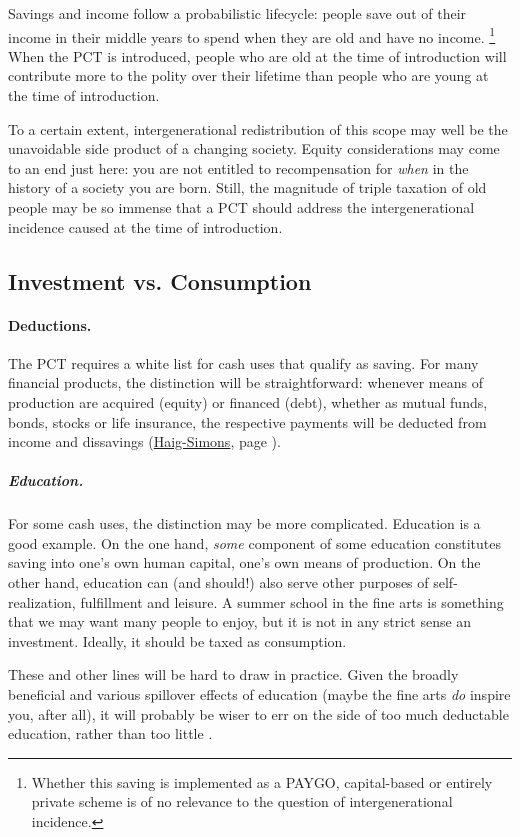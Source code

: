 Savings and income follow a probabilistic lifecycle:
people save out of their income in their middle years to spend when they are old and have no income.
\footnote{
	Whether this saving is implemented as a PAYGO, capital-based or entirely private scheme is of no relevance to the question of intergenerational incidence.
}
When the PCT is introduced, people who are old at the time of introduction will contribute more to the polity over their lifetime than people who are young at the time of introduction.

To a certain extent, intergenerational redistribution of this scope may well be the unavoidable side product of a changing society.
Equity considerations may come to an end just here:
you are not entitled to recompensation for \emph{when} in the history of a society you are born.
Still, the magnitude of triple taxation of old people may be so immense that a PCT should address the intergenerational incidence caused at the time of introduction.

\subsection{Investment vs. Consumption}

\paragraph{Deductions.}
The PCT requires a white list for cash uses that qualify as saving.
For many financial products, the distinction will be straightforward:
whenever means of production are acquired (equity) or financed (debt), whether as mutual funds, bonds, stocks or life insurance, the respective payments will be deducted from income and dissavings (\hyperref[eq:HaigSimonsPCT]{Haig-Simons}, page \pageref{eq:HaigSimonsPCT}).

\subparagraph{Education.}
For some cash uses, the distinction may be more complicated.
Education is a good example.
On the one hand, \emph{some} component of some education constitutes saving into one's own human capital, one's own means of production.
On the other hand, education can (and should!) also serve other purposes of self-realization, fulfillment and leisure.
A summer school in the fine arts is something that we may want many people to enjoy, but it is not in any strict sense an investment.
Ideally, it should be taxed as consumption.

These and other lines will be hard to draw in practice.
Given the broadly beneficial and various spillover effects of education (maybe the fine arts \emph{do} inspire you, after all), it will probably be wiser to err on the side of too much deductable education, rather than too little \citep[8]{Seidman1997}.

